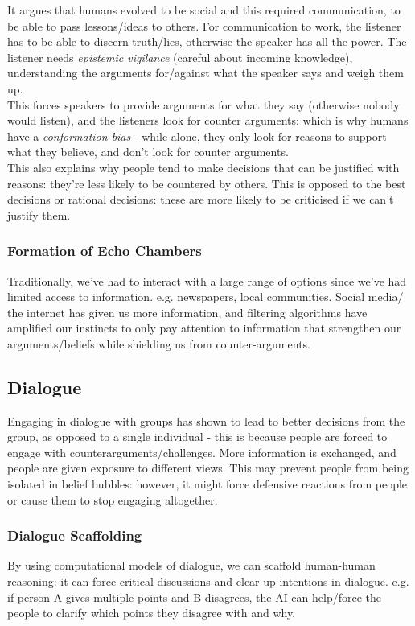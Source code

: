 It argues that humans evolved to be social and this required communication, to be able to pass lessons/ideas to others. For communication to work, the listener has to be able to discern truth/lies, otherwise the speaker has all the power. The listener needs \emph{epistemic vigilance} (careful about incoming knowledge), understanding the arguments for/against what the speaker says and weigh them up. \\

This forces speakers to provide arguments for what they say (otherwise nobody would listen), and the listeners look for counter arguments: which is why humans have a \emph{conformation bias} - while alone, they only look for reasons to support what they believe, and don't look for counter arguments. \\

This also explains why people tend to make decisions that can be justified with reasons: they're less likely to be countered by others. This is opposed to the best decisions or rational decisions: these are more likely to be criticised if we can't justify them. 

\subsubsection{Formation of Echo Chambers}
Traditionally, we've had to interact with a large range of options since we've had limited access to information. e.g. newspapers, local communities. Social media/ the internet has given us more information, and filtering algorithms have amplified our instincts to only pay attention to information that strengthen our arguments/beliefs while shielding us from counter-arguments.

\subsection{Dialogue}
Engaging in dialogue with groups has shown to lead to better decisions from the group, as opposed to a single individual - this is because people are forced to engage with counterarguments/challenges. More information is exchanged, and people are given exposure to different views. This may prevent people from being isolated in belief bubbles: however, it might force defensive reactions from people or cause them to stop engaging altogether.\\

\subsubsection{Dialogue Scaffolding}
By using computational models of dialogue, we can scaffold human-human reasoning: it can force critical discussions and clear up intentions in dialogue. e.g. if person A gives multiple points and B disagrees, the AI can help/force the people to clarify which points they disagree with and why.\\ 


